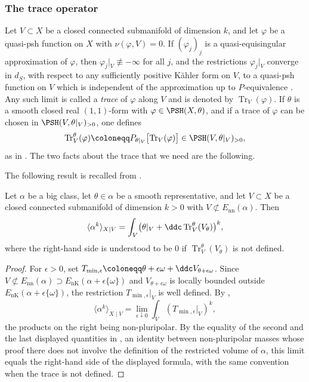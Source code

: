 \subsubsection*{The trace operator}
Let $V\subset X$ be a closed connected submanifold of dimension $k$, and let
$\varphi$ be a quasi-psh function on $X$ with $\nu(\varphi,V)=0$. If
$(\varphi_j)_j$ is a quasi-equisingular approximation of $\varphi$, then
$\varphi_j|_V\not\equiv-\infty$ for all $j$, and the restrictions
$\varphi_j|_V$ converge in ${d_S}$, with respect to any sufficiently
positive K\"ahler form on $V$, to a quasi-psh function on $V$ which is
independent of the approximation up to $P$-equivalence
\cite[Proposition~8.1.1, Definition~8.1.1, Proposition~8.1.2]{SGPT}. Any
such limit is called a \emph{trace} of $\varphi$ along $V$ and is denoted
by $\operatorname{Tr}_V(\varphi)$. If $\theta$ is a smooth closed real
$(1,1)$-form with $\varphi\in\PSH(X,\theta)$, and if a trace of
$\varphi$ can be chosen in $\PSH(V,\theta|_V)_{>0}$, one defines
\[
  \operatorname{Tr}^\theta_V(\varphi)\coloneqq P_{\theta|_V}\bigl[\operatorname{Tr}_V(\varphi)\bigr]
  \in\PSH(V,\theta|_V)_{>0},
\]
as in \cite[Definition~8.1.2]{SGPT}. The two facts about the trace that we
need are the following.

The following result is recalled from \cite[Theorem~8.3.1]{SGPT}.

\begin{theorem}\label{nk:thm:trace-formula}
Let $\alpha$ be a big class, let $\theta\in\alpha$ be a smooth
representative, and let $V\subset X$ be a closed connected submanifold of
dimension $k>0$ with $V\not\subset{E_{\mathrm{nn}}}(\alpha)$. Then
\[
  \langle\alpha^k\rangle_{X\mid V}
  =\int_V\bigl(\theta|_V+\ddc\operatorname{Tr}^\theta_V(V_\theta)\bigr)^k,
\]
where the right-hand side is understood to be $0$ if
$\operatorname{Tr}^\theta_V(V_\theta)$ is not defined.
\end{theorem}

\begin{proof}
For $\epsilon>0$, set
$T_{\min,\epsilon}\coloneqq \theta+\epsilon\omega+\ddc V_{\theta+\epsilon\omega}$.
Since $V\not\subset{E_{\mathrm{nn}}}(\alpha)\supset{E_{\mathrm{nK}}}(\alpha+\epsilon\{\omega\})$
and $V_{\theta+\epsilon\omega}$ is locally bounded outside
${E_{\mathrm{nK}}}(\alpha+\epsilon\{\omega\})$, the restriction
$T_{\min,\epsilon}|_V$ is well defined. By
\cite[Remark~2.2 and equation~(2.3)]{CT22Restricted},
\[
  \langle\alpha^k\rangle_{X\mid V}
  =\lim_{\epsilon\downarrow0}\int_V(T_{\min,\epsilon}|_V)^k,
\]
the products on the right being non-pluripolar. By the equality of the
second and the last displayed quantities in
\cite[Theorem~8.3.1]{SGPT}, an identity between non-pluripolar
masses whose proof there does not involve the definition of the
restricted volume of $\alpha$, this limit equals
the right-hand side of the displayed formula, with the same convention
when the trace is not defined.
\end{proof}

